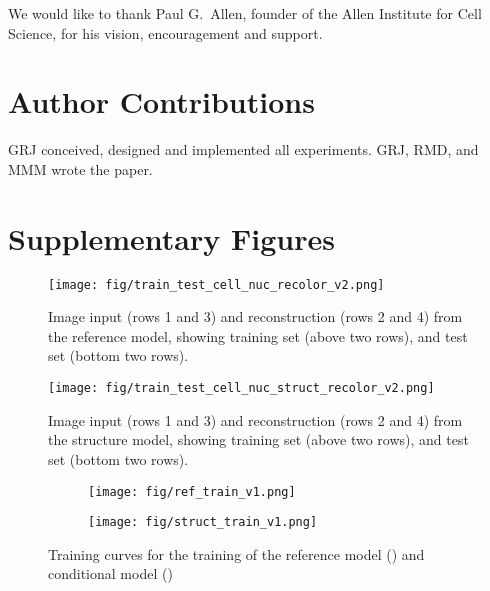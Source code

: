 \documentclass[accepted]{article}
\newcommand{\beginsupplement}{%
        \setcounter{table}{0}
        \renewcommand{\thetable}{S\arabic{table}}%
        \setcounter{figure}{0}
        \renewcommand{\thefigure}{S\arabic{figure}}%
     }
\begin{document}
We would like to thank Paul G.\ Allen, founder of the Allen Institute for Cell Science, for his vision, encouragement and support.

\section*{Author Contributions}

GRJ conceived, designed and implemented all experiments.
GRJ, RMD, and MMM wrote the paper.

\clearpage


% 




\clearpage


\appendix
\beginsupplement

\section{Supplementary Figures}

\begin{figure*}[htbp]
\centering
\texttt{[image: fig/train\_test\_cell\_nuc\_recolor\_v2.png]}
\caption{Image input (rows 1 and 3) and reconstruction (rows 2 and 4) from the reference model, showing training set (above two rows), and test set (bottom two rows).}
\label{fig:traintest_ref}
\end{figure*}

\begin{figure*}[htbp]
\centering
\texttt{[image: fig/train\_test\_cell\_nuc\_struct\_recolor\_v2.png]}
\caption{Image input (rows 1 and 3) and reconstruction (rows 2 and 4) from the structure model, showing training set (above two rows), and test set (bottom two rows).}
\label{fig:traintest_struct}
\end{figure*}

\begin{figure*}[htbp]
  \centering
  \begin{subfigure}[b]{0.45\textwidth}
    \centering\texttt{[image: fig/ref\_train\_v1.png]}
    \caption{\label{fig:traincurves:fig1}}
  \end{subfigure}%
  \begin{subfigure}[b]{0.45\textwidth}
    \centering\texttt{[image: fig/struct\_train\_v1.png]}
    \caption{\label{fig:traincurves:fig2}}
  \end{subfigure}
  \caption{Training curves for the training of the reference model () and conditional model ()}
  \label{fig:traincurves}
\end{figure*}
\end{document}

